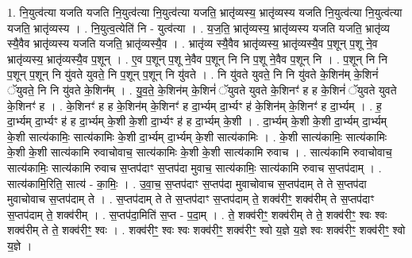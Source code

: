 \documentclass[17pt]{extarticle}
\begin{document}
1. नि॒युत्व॑त्या यजति यजति नि॒युत्व॑त्या नि॒युत्व॑त्या यजति॒ भ्रातृ॑व्यस्य॒ भ्रातृ॑व्यस्य यजति नि॒युत्व॑त्या नि॒युत्व॑त्या यजति॒ भ्रातृ॑व्यस्य । . नि॒युत्व॒त्येति॑ नि - युत्व॑त्या । . य॒ज॒ति॒ भ्रातृ॑व्यस्य॒ भ्रातृ॑व्यस्य यजति यजति॒ भ्रातृ॑व्य स्यै॒वैव भ्रातृ॑व्यस्य यजति यजति॒ भ्रातृ॑व्यस्यै॒व । . भ्रातृ॑व्य स्यै॒वैव भ्रातृ॑व्यस्य॒ भ्रातृ॑व्यस्यै॒व प॒शून् प॒शू ने॒व भ्रातृ॑व्यस्य॒ भ्रातृ॑व्यस्यै॒व प॒शून् । . ए॒व प॒शून् प॒शू ने॒वैव प॒शून् नि नि प॒शू ने॒वैव प॒शून् नि । . प॒शून् नि नि प॒शून् प॒शून् नि यु॑वते युवते॒ नि प॒शून् प॒शून् नि यु॑वते । . नि यु॑वते युवते॒ नि नि यु॑वते के॒शिन॑म् के॒शिनं॑ ॅयुवते॒ नि नि यु॑वते के॒शिन᳚म् । . यु॒व॒ते॒ के॒शिन॑म् के॒शिनं॑ ॅयुवते युवते के॒शिनꣳ॑ ह ह के॒शिनं॑ ॅयुवते युवते के॒शिनꣳ॑ ह । . के॒शिनꣳ॑ ह ह के॒शिन॑म् के॒शिनꣳ॑ ह दा॒र्भ्यम् दा॒र्भ्यꣳ ह॑ के॒शिन॑म् के॒शिनꣳ॑ ह दा॒र्भ्यम् । . ह॒ दा॒र्भ्यम् दा॒र्भ्यꣳ ह॑ ह दा॒र्भ्यम् के॒शी के॒शी दा॒र्भ्यꣳ ह॑ ह दा॒र्भ्यम् के॒शी । . दा॒र्भ्यम् के॒शी के॒शी दा॒र्भ्यम् दा॒र्भ्यम् के॒शी सात्य॑कामिः॒ सात्य॑कामिः के॒शी दा॒र्भ्यम् दा॒र्भ्यम् के॒शी सात्य॑कामिः । . के॒शी सात्य॑कामिः॒ सात्य॑कामिः के॒शी के॒शी सात्य॑कामि रुवाचोवाच॒ सात्य॑कामिः के॒शी के॒शी सात्य॑कामि रुवाच । . सात्य॑कामि रुवाचोवाच॒ सात्य॑कामिः॒ सात्य॑कामि रुवाच स॒प्तप॑दाꣳ स॒प्तप॑दा मुवाच॒ सात्य॑कामिः॒ सात्य॑कामि रुवाच स॒प्तप॑दाम् । . सात्य॑कामि॒रिति॒ सात्य॑ - का॒मिः॒ । . उ॒वा॒च॒ स॒प्तप॑दाꣳ स॒प्तप॑दा मुवाचोवाच स॒प्तप॑दाम् ते ते स॒प्तप॑दा मुवाचोवाच स॒प्तप॑दाम् ते । . स॒प्तप॑दाम् ते ते स॒प्तप॑दाꣳ स॒प्तप॑दाम् ते॒ शक्व॑रीꣳ॒॒ शक्व॑रीम् ते स॒प्तप॑दाꣳ स॒प्तप॑दाम् ते॒ शक्व॑रीम् । . स॒प्तप॑दा॒मिति॑ स॒प्त - प॒दा॒म् । . ते॒ शक्व॑रीꣳ॒॒ शक्व॑रीम् ते ते॒ शक्व॑रीꣳ॒॒ श्वः श्वः शक्व॑रीम् ते ते॒ शक्व॑रीꣳ॒॒ श्वः । . शक्व॑रीꣳ॒॒ श्वः श्वः शक्व॑रीꣳ॒॒ शक्व॑रीꣳ॒॒ श्वो य॒ज्ञे य॒ज्ञे श्वः शक्व॑रीꣳ॒॒ शक्व॑रीꣳ॒॒ श्वो य॒ज्ञे । \newline
\end{document}
